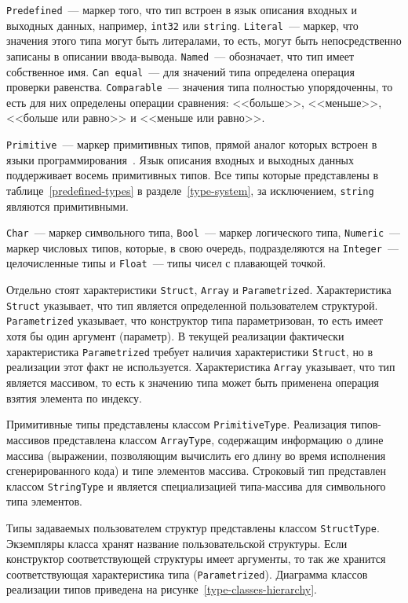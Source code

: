 \documentclass[times,specification,annotation]{style/itmo-student-thesis/itmo-student-thesis}
\begin{document}
\texttt{Predefined}~--- маркер того, что тип встроен в язык описания входных и выходных данных, например, \texttt{int32} или \texttt{string}. \texttt{Literal}~--- маркер, что значения этого типа могут быть литералами, то есть, могут быть непосредственно записаны в описании ввода-вывода. \texttt{Named}~--- обозначает, что тип имеет собственное имя. \texttt{Can equal}~--- для значений типа определена операция проверки равенства. \texttt{Comparable}~--- значения типа полностью упорядоченны, то есть для них определены операции сравнения: <<больше>>, <<меньше>>, <<больше или равно>> и <<меньше или равно>>.

\texttt{Primitive}~--- маркер примитивных типов, прямой аналог которых встроен в языки программирования~\cite{stone1987program}. Язык описания входных и выходных данных поддерживает восемь примитивных типов. Все типы которые представлены в таблице~\ref{predefined-types} в разделе~\ref{type-system}, за исключением, \texttt{string} являются примитивными.

\texttt{Char}~--- маркер символьного типа, \texttt{Bool}~--- маркер логического типа, \texttt{Numeric}~--- маркер числовых типов, которые, в свою очередь, подразделяются на \texttt{Integer}~--- целочисленные типы и \texttt{Float}~--- типы чисел с плавающей точкой. 

Отдельно стоят характеристики \texttt{Struct}, \texttt{Array} и \texttt{Parametrized}. Характеристика \texttt{Struct} указывает, что тип является определенной пользователем структурой. \texttt{Parametrized} указывает, что конструктор типа параметризован, то есть имеет хотя бы один аргумент (параметр). В текущей реализации фактически характеристика \texttt{Parametrized} требует наличия характеристики \texttt{Struct}, но в реализации этот факт не используется. Характеристика \texttt{Array} указывает, что тип является массивом, то есть к значению типа может быть применена операция взятия элемента по индексу.

Примитивные типы представлены классом \texttt{PrimitiveType}. Реализация типов-массивов представлена классом \texttt{ArrayType}, содержащим информацию о длине массива (выражении, позволяющим вычислить его длину во время исполнения сгенерированного кода) и типе элементов массива. Строковый тип представлен классом \texttt{StringType} и является специализацией типа-массива для символьного типа элементов.

Типы задаваемых пользователем структур представлены классом \texttt{StructType}. Экземпляры класса хранят название пользовательской структуры. Если конструктор соответствующей структуры имеет аргументы, то так же хранится соответствующая характеристика типа (\texttt{Parametrized}). Диаграмма классов реализации типов приведена на рисунке~\ref{type-classes-hierarchy}.
\end{document}
